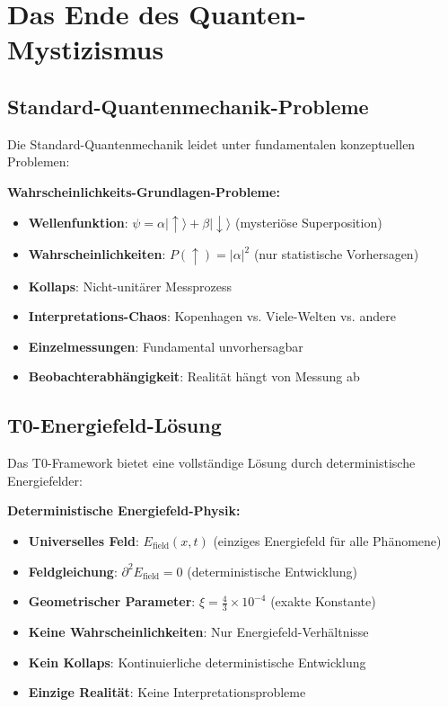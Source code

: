 \documentclass[12pt,a4paper]{report}
\begin{document}
	\section{Das Ende des Quanten-Mystizismus}
	\label{sec:end_quantum_mysticism}
	
	\subsection{Standard-Quantenmechanik-Probleme}
	\label{subsec:standard_qm_problems}
	
	Die Standard-Quantenmechanik leidet unter fundamentalen konzeptuellen Problemen:
	
	\begin{tcolorbox}[colback=red!5!white,colframe=red!75!black,title=Standard-QM-Probleme]
		\textbf{Wahrscheinlichkeits-Grundlagen-Probleme:}
		\begin{itemize}
			\item \textbf{Wellenfunktion}: $\psi = \alpha|\uparrow\rangle + \beta|\downarrow\rangle$ (mysteriöse Superposition)
			\item \textbf{Wahrscheinlichkeiten}: $P(\uparrow) = |\alpha|^2$ (nur statistische Vorhersagen)
			\item \textbf{Kollaps}: Nicht-unitärer Messprozess
			\item \textbf{Interpretations-Chaos}: Kopenhagen vs. Viele-Welten vs. andere
			\item \textbf{Einzelmessungen}: Fundamental unvorhersagbar
			\item \textbf{Beobachterabhängigkeit}: Realität hängt von Messung ab
		\end{itemize}
	\end{tcolorbox}
	
	\subsection{T0-Energiefeld-Lösung}
	\label{subsec:t0_solution}
	
	Das T0-Framework bietet eine vollständige Lösung durch deterministische Energiefelder:
	
	\begin{tcolorbox}[colback=blue!5!white,colframe=blue!75!black,title=T0-Deterministische Grundlage]
		\textbf{Deterministische Energiefeld-Physik:}
		\begin{itemize}
			\item \textbf{Universelles Feld}: $E_{\text{field}}(x,t)$ (einziges Energiefeld für alle Phänomene)
			\item \textbf{Feldgleichung}: $\partial^2 E_{\text{field}} = 0$ (deterministische Entwicklung)
			\item \textbf{Geometrischer Parameter}: $\xi = \frac{4}{3} \times 10^{-4}$ (exakte Konstante)
			\item \textbf{Keine Wahrscheinlichkeiten}: Nur Energiefeld-Verhältnisse
			\item \textbf{Kein Kollaps}: Kontinuierliche deterministische Entwicklung
			\item \textbf{Einzige Realität}: Keine Interpretationsprobleme
		\end{itemize}
	\end{tcolorbox}
	
\end{document}
